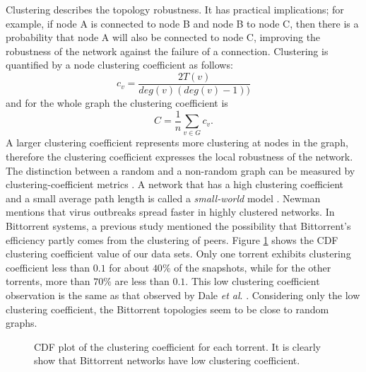 \documentclass[paper]{ieice}
\begin{document}
Clustering describes the topology robustness. 
It has practical implications; for example, if node A is connected to node B and node B to node C, then there is a probability that node A will also be
connected to node C, improving the robustness of the network against the failure of a connection.  
Clustering is quantified by a node clustering coefficient as follows:
\begin{equation}
c_v = \frac{2T(v)}{deg(v) (deg(v)-1))}
\end{equation} 
and for the whole graph the clustering coefficient is
\begin{equation}
C = \frac{1}{n} \sum_{v \in G} c_v.
\end{equation}
A larger clustering coefficient represents more clustering at nodes in the graph, therefore the clustering coefficient expresses the local robustness of the network.
The distinction between a random and a non-random graph can be measured by clustering-coefficient metrics \cite{watts1998collective}.
A network that has a high clustering coefficient and a small average path length is called a \textit{small-world} model \cite{watts1998collective}.
Newman \cite{newman2003properties} mentions that virus outbreaks spread faster in highly clustered networks. 
In Bittorrent systems, a previous study \cite{legout2007clustering} mentioned the possibility that Bittorrent's efficiency partly comes from the clustering of peers.
Figure \ref{fig:cdf-clustering} shows the CDF clustering coefficient value of our data sets.
Only one torrent exhibits clustering coefficient less than $0.1$ for about $40\%$ of the snapshots, while for the other torrents, more than  $70\%$ are less than $0.1$.
This low clustering coefficient observation is the same as that observed by Dale \textit{et al}. \cite{dale2008evolution}.
Considering only the low clustering coefficient, the Bittorrent topologies seem to be close to random graphs.
\begin{figure}
\centering
{}
\caption{CDF plot of the clustering coefficient for each torrent. It is clearly show that Bittorrent networks have low clustering coefficient.} 
\label{fig:cdf-clustering}
\vspace{-2mm}
\end{figure}
\end{document}

